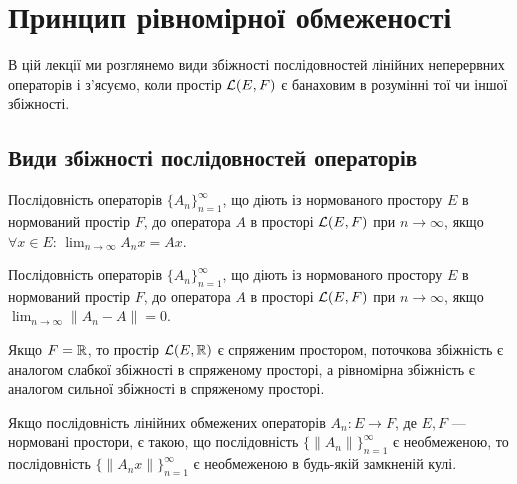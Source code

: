 \chapter{Принцип рівномірної обмеженості}

В цій лекції ми розглянемо види збіжності послідовностей
лінійних неперервних операторів і з’ясуємо, коли простір
$\mathcal{L}(E, F)$ є банаховим в розумінні тої чи іншої збіжності.

\section{Види збіжності послідовностей операторів}

\begin{definition}
Послідовність операторів $\{A_n\}_{n = 1}^\infty$, що діють із
нормованого простору $E$ в нормований простір $F$,
 до оператора $A$ в просторі $\mathcal{L}(E, F)$
при $n \to \infty$, якщо $\forall x \in E$: $\lim_{n \to \infty} A_n x = A x$.
\end{definition}

\begin{definition}
Послідовність операторів $\{A_n\}_{n = 1}^\infty$, що діють із
нормованого простору $E$ в нормований простір $F$,
 до оператора $A$ в просторі $\mathcal{L}(E, F)$
при $n \to \infty$, якщо $\lim_{n \to \infty} \|A_n - A\| = 0$.
\end{definition}

\begin{remark}
Якщо $F = \mathbb{R}$, то простір $\mathcal{L}(E, \mathbb{R})$ є
спряженим простором, поточкова збіжність є аналогом
слабкої збіжності в спряженому просторі, а рівномірна
збіжність є аналогом сильної збіжності в спряженому
просторі.
\end{remark}

\begin{lemma}
Якщо послідовність лінійних обмежених
операторів $A_n: E \to F$, де $E, F$ --- нормовані простори, є
такою, що послідовність $\{\|A_n\|\}_{n = 1}^\infty$
є необмеженою, то послідовність $\{\|A_n x\|\}_{n = 1}^\infty$
є необмеженою в будь-якій замкненій кулі.
\end{lemma}

